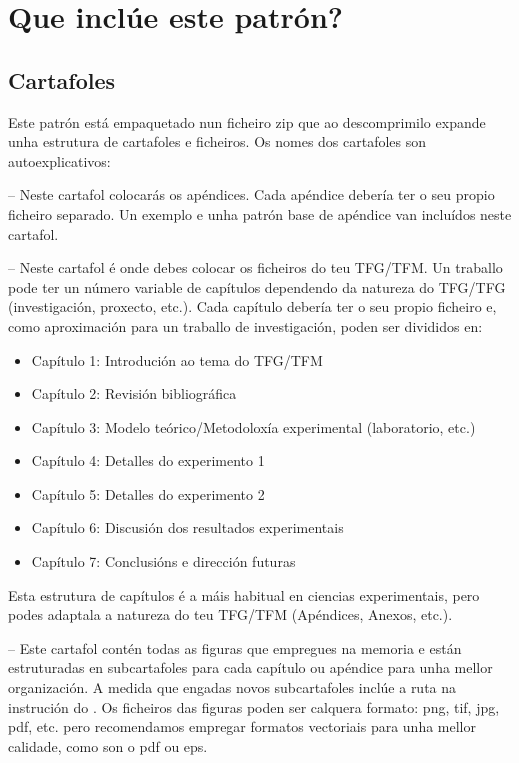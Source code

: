 
\section{Que inclúe este patrón?}

\subsection{Cartafoles}
Este patrón está empaquetado nun ficheiro zip que ao descomprimilo expande unha estrutura de cartafoles e ficheiros. Os nomes dos cartafoles son autoexplicativos: 

 -- Neste cartafol colocarás os apéndices. Cada apéndice debería ter o seu propio ficheiro  separado. Un exemplo e unha patrón base de apéndice van incluídos neste cartafol.

 -- Neste cartafol é onde debes colocar os ficheiros do teu TFG/TFM. Un traballo pode ter un número variable de capítulos dependendo da natureza do TFG/TFG (investigación, proxecto, etc.). Cada capítulo debería ter o seu propio ficheiro  e, como aproximación para un traballo de investigación, poden ser divididos en:
\begin{itemize}
\item Capítulo 1: Introdución ao tema do TFG/TFM 
\item Capítulo 2: Revisión bibliográfica
\item Capítulo 3: Modelo teórico/Metodoloxía experimental (laboratorio, etc.)
\item Capítulo 4: Detalles do experimento 1
\item Capítulo 5: Detalles do experimento 2
\item Capítulo 6: Discusión dos resultados experimentais
\item Capítulo 7: Conclusións e dirección futuras
\end{itemize}
Esta estrutura de capítulos é a máis habitual en ciencias experimentais, pero podes adaptala a natureza do teu TFG/TFM (Apéndices, Anexos, etc.).

 -- Este cartafol contén todas as figuras que empregues na memoria e están estruturadas en subcartafoles para cada capítulo ou apéndice para unha mellor organización. A medida que engadas novos subcartafoles inclúe a ruta na instrución  do .
Os ficheiros das figuras poden ser calquera formato: png, tif, jpg, pdf, etc. pero recomendamos empregar formatos vectoriais para unha mellor calidade, como son o pdf ou eps.


